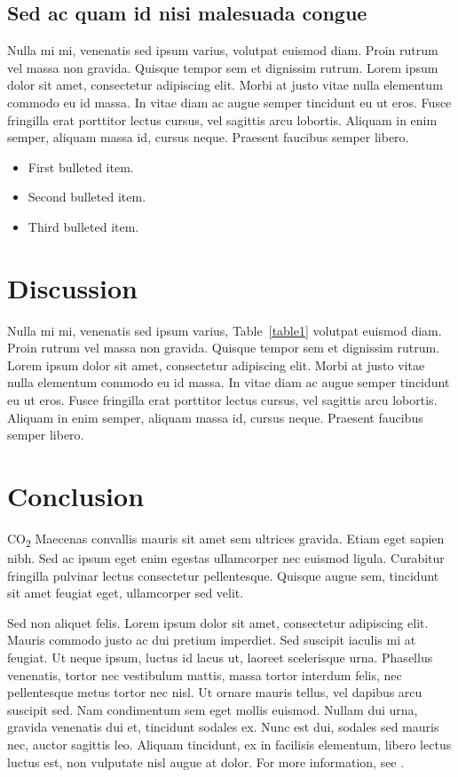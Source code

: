 \documentclass[10pt,letterpaper]{article}
\begin{document}
\subsection*{Sed ac quam id nisi malesuada congue}

Nulla mi mi, venenatis sed ipsum varius, volutpat euismod diam. Proin rutrum vel massa non gravida. Quisque tempor sem et dignissim rutrum. Lorem ipsum dolor sit amet, consectetur adipiscing elit. Morbi at justo vitae nulla elementum commodo eu id massa. In vitae diam ac augue semper tincidunt eu ut eros. Fusce fringilla erat porttitor lectus cursus, vel sagittis arcu lobortis. Aliquam in enim semper, aliquam massa id, cursus neque. Praesent faucibus semper libero.

\begin{itemize}
	\item First bulleted item.
	\item Second bulleted item.
	\item Third bulleted item.
\end{itemize}

\section*{Discussion}
Nulla mi mi, venenatis sed ipsum varius, Table~\ref{table1} volutpat euismod diam. Proin rutrum vel massa non gravida. Quisque tempor sem et dignissim rutrum. Lorem ipsum dolor sit amet, consectetur adipiscing elit. Morbi at justo vitae nulla elementum commodo eu id massa. In vitae diam ac augue semper tincidunt eu ut eros. Fusce fringilla erat porttitor lectus cursus, vel sagittis arcu lobortis. Aliquam in enim semper, aliquam massa id, cursus neque. Praesent faucibus semper libero.

\section*{Conclusion}

CO\textsubscript{2} Maecenas convallis mauris sit amet sem ultrices gravida. Etiam eget sapien nibh. Sed ac ipsum eget enim egestas ullamcorper nec euismod ligula. Curabitur fringilla pulvinar lectus consectetur pellentesque. Quisque augue sem, tincidunt sit amet feugiat eget, ullamcorper sed velit. 

Sed non aliquet felis. Lorem ipsum dolor sit amet, consectetur adipiscing elit. Mauris commodo justo ac dui pretium imperdiet. Sed suscipit iaculis mi at feugiat. Ut neque ipsum, luctus id lacus ut, laoreet scelerisque urna. Phasellus venenatis, tortor nec vestibulum mattis, massa tortor interdum felis, nec pellentesque metus tortor nec nisl. Ut ornare mauris tellus, vel dapibus arcu suscipit sed. Nam condimentum sem eget mollis euismod. Nullam dui urna, gravida venenatis dui et, tincidunt sodales ex. Nunc est dui, sodales sed mauris nec, auctor sagittis leo. Aliquam tincidunt, ex in facilisis elementum, libero lectus luctus est, non vulputate nisl augue at dolor. For more information, see .
\end{document}
